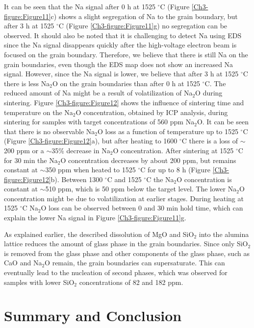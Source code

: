 It can be seen that the Na signal after 0 h at 1525 $^{\circ}$C (Figure \ref{Ch3-figure:Figure11}c) shows a slight segregation of Na to the grain boundary, but after 3 h at 1525 $^{\circ}$C (Figure \ref{Ch3-figure:Figure11}g) no segregation can be observed. It should also be noted that it is challenging to detect Na using EDS since the Na signal disappears quickly after the high-voltage electron beam is focused on the grain boundary. Therefore, we believe that there is still Na on the grain boundaries, even though the EDS map does not show an increased Na signal. However, since the Na signal is lower, we believe that after 3 h at 1525 $^{\circ}$C there is less Na$_{2}$O on the grain boundaries than after 0 h at 1525 $^{\circ}$C. The reduced amount of Na might be a result of volatilization of Na$_{2}$O during sintering. Figure \ref{Ch3-figure:Figure12} shows the influence of sintering time and temperature on the Na$_{2}$O concentration, obtained by ICP analysis, during sintering for samples with target concentrations of 560 ppm Na$_{2}$O. It can be seen that there is no observable Na$_{2}$O loss as a function of temperature up to 1525 $^{\circ}$C (Figure \ref{Ch3-figure:Figure12}a), but after heating to 1600 $^{\circ}$C there is a loss of $\sim$200 ppm or a $\sim$35\% decrease in Na$_{2}$O concentration. After sintering at 1525 $^{\circ}$C for 30 min the Na$_{2}$O concentration decreases by about 200 ppm, but remains constant at $\sim$350 ppm when heated to 1525 $^{\circ}$C for up to 8 h (Figure \ref{Ch3-figure:Figure12}b). Between 1300 $^{\circ}$C and 1525 $^{\circ}$C the Na$_{2}$O concentration is constant at $\sim$510 ppm, which is 50 ppm below the target level. The lower Na$_{2}$O concentration might be due to volatilization at earlier stages. During heating at 1525 $^{\circ}$C Na$_{2}$O loss can be observed between 0 and 30 min hold time, which can explain the lower Na signal in Figure \ref{Ch3-figure:Figure11}g. 

As explained earlier, the described dissolution of MgO and SiO$_{2}$ into the alumina lattice reduces the amount of glass phase in the grain boundaries. Since only SiO$_{2}$ is removed from the glass phase and other components of the glass phase, such as CaO and Na$_{2}$O remain, the grain boundaries can supersaturate. This can eventually lead to the nucleation of second phases, which was observed for samples with lower SiO$_{2}$ concentrations of 82 and 182 ppm.

\section{Summary and Conclusion}

